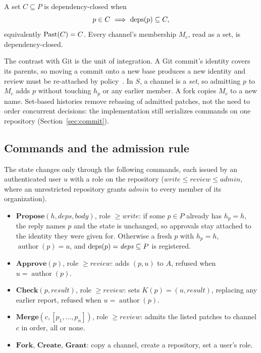 \begin{definition}\label{def:closed}
A set $C\subseteq P$ is dependency-closed when
\begin{equation}
 p\in C\ \Longrightarrow\ \deps(p)\subseteq C,
 \label{eq:closure}
\end{equation}
equivalently $\operatorname{Past}(C)=C$. Every channel's membership $M_c$, read as a set, is dependency-closed.
\end{definition}

The contrast with Git is the unit of integration. A Git commit's identity covers its parents, so moving a commit onto a new base produces a new identity and review must be re-attached by policy~\cite{gitobjects,gitrebase}. In $S$, a channel is a \emph{set}, so admitting $p$ to $M_c$ adds $p$ without touching $h_p$ or any earlier member. A fork copies $M_c$ to a new name. Set-based histories remove rebasing of admitted patches, not the need to order concurrent decisions: the implementation still serializes commands on one repository (Section~\ref{sec:commit}).

\subsection{Commands and the admission rule}\label{sec:commands}
The state changes only through the following commands, each issued by an authenticated user $u$ with a role on the repository ($\mathit{write}\le\mathit{review}\le\mathit{admin}$, where an unrestricted repository grants $\mathit{admin}$ to every member of its organization).
\begin{itemize}
\item $\mathbf{Propose}(h,\mathit{deps},\mathit{body})$, role $\ge\mathit{write}$: if some $p\in P$ already has $h_p=h$, the reply names $p$ and the state is unchanged, so approvals stay attached to the identity they were given for. Otherwise a fresh $p$ with $h_p=h$, $\operatorname{author}(p)=u$, and $\operatorname{deps}(p)=\mathit{deps}\subseteq P$ is registered.
\item $\mathbf{Approve}(p)$, role $\ge\mathit{review}$: adds $(p,u)$ to $A$, refused when $u=\operatorname{author}(p)$.
\item $\mathbf{Check}(p,\mathit{result})$, role $\ge\mathit{review}$: sets $K(p)=(u,\mathit{result})$, replacing any earlier report, refused when $u=\operatorname{author}(p)$.
\item $\mathbf{Merge}(c,[p_1,\dots,p_n])$, role $\ge\mathit{review}$: admits the listed patches to channel $c$ in order, all or none.
\item $\mathbf{Fork}$, $\mathbf{Create}$, $\mathbf{Grant}$: copy a channel, create a repository, set a user's role.
\end{itemize}

